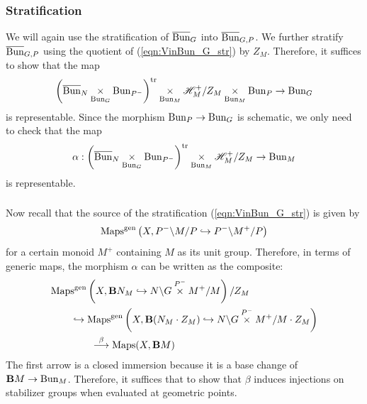 \subsubsection{Stratification} We will again use the stratification of $\overline{\mathrm{Bun}}_G$ into $\overline{\mathrm{Bun}}_{G,P}$. We further stratify $\overline{\mathrm{Bun}}_{G,P}$ using the quotient of (\ref{eqn:VinBun_G_str}) by $Z_M$. Therefore, it suffices to show that the map
    \[
    \left(\overline{\mathrm{Bun}}_N \underset{\mathrm{Bun}_G}{\times} \mathrm{Bun}_{P^-} \right)^{\mathrm{tr}} \underset{\mathrm{Bun}_M}{\times} \mathscr{H}_M^+/Z_M \underset{\mathrm{Bun}_M}{\times} \mathrm{Bun}_P \to \mathrm{Bun}_G
    \]
is representable. Since the morphism $\mathrm{Bun}_P \to \mathrm{Bun}_G$ is schematic, we only need to check that the map
    \[
    \alpha : \left(\overline{\mathrm{Bun}}_N \underset{\mathrm{Bun}_G}{\times} \mathrm{Bun}_{P^-} \right)^{\mathrm{tr}} \underset{\mathrm{Bun}_M}{\times} \mathscr{H}_M^+/Z_M \to \mathrm{Bun}_M
    \]
is representable. 

\subsubsection{} Now recall that the source of the stratification (\ref{eqn:VinBun_G_str}) is given by
    \[
    \mathrm{Maps}^{\mathrm{gen}}\left(X, P^- \backslash M/P \hookrightarrow P^- \backslash M^+ /P \right)
    \]
for a certain monoid $M^+$ containing $M$ as its unit group. Therefore, in terms of generic maps, the morphism $\alpha$ can be written as the composite:
\begin{align*}
    & \mathrm{Maps}^{\mathrm{gen}}\left( X, \mathbf{B} N_M \hookrightarrow N \backslash G \overset{P^-}{\times} M^+/M \right)/Z_M \\
    & \qquad \hookrightarrow \mathrm{Maps}^{\mathrm{gen}}\left( X, \mathbf{B} (N_M \cdot Z_M) \hookrightarrow N \backslash G \overset{P^-}{\times} M^+/M \cdot Z_M \right) \\
    & \qquad \qquad \overset{\beta}{\longrightarrow} \mathrm{Maps}(X, \mathbf{B} M)
\end{align*}
The first arrow is a closed immersion because it is a base change of $\mathbf{B} M \to \mathrm{Bun}_M$. Therefore, it suffices that to show that $\beta$ induces injections on stabilizer groups when evaluated at geometric points. 

